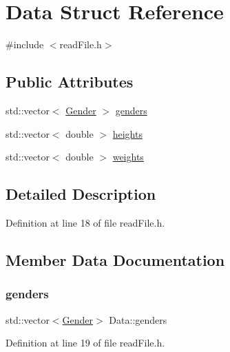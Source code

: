 \hypertarget{struct_data}{}\section{Data Struct Reference}
\label{struct_data}


{\ttfamily \#include $<$read\+File.\+h$>$}

\subsection*{Public Attributes}
\begin{DoxyCompactItemize}
\item 
std\+::vector$<$ \mbox{\hyperlink{read_file_8h_a3667e3c5ec056737c8789615a989324f}{Gender}} $>$ \mbox{\hyperlink{struct_data_a4eac8d45a02dd36dec2e59d10d89828a}{genders}}
\item 
std\+::vector$<$ double $>$ \mbox{\hyperlink{struct_data_af8859b12fd48d0b1f8136b82a54f269e}{heights}}
\item 
std\+::vector$<$ double $>$ \mbox{\hyperlink{struct_data_a240f15bb7792f4b6326f760f2a5020cd}{weights}}
\end{DoxyCompactItemize}


\subsection{Detailed Description}


Definition at line 18 of file read\+File.\+h.



\subsection{Member Data Documentation}
\mbox{\label{struct_data_a4eac8d45a02dd36dec2e59d10d89828a}} 
\subsubsection{\texorpdfstring{genders}{genders}}
{\footnotesize\ttfamily std\+::vector$<$\mbox{\hyperlink{read_file_8h_a3667e3c5ec056737c8789615a989324f}{Gender}}$>$ Data\+::genders}



Definition at line 19 of file read\+File.\+h.

\mbox{\label{struct_data_af8859b12fd48d0b1f8136b82a54f269e}} 
